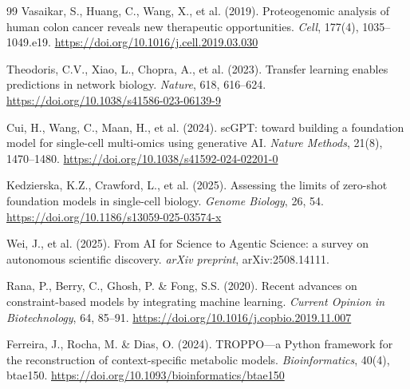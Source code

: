 \documentclass[12pt,a4paper]{article}
\begin{document}
\begin{thebibliography}{99}
 Vasaikar, S., Huang, C., Wang, X., et al. (2019). Proteogenomic analysis of human colon cancer reveals new therapeutic opportunities. \textit{Cell}, 177(4), 1035--1049.e19. \url{https://doi.org/10.1016/j.cell.2019.03.030}

 Theodoris, C.V., Xiao, L., Chopra, A., et al. (2023). Transfer learning enables predictions in network biology. \textit{Nature}, 618, 616--624. \url{https://doi.org/10.1038/s41586-023-06139-9}

 Cui, H., Wang, C., Maan, H., et al. (2024). scGPT: toward building a foundation model for single-cell multi-omics using generative AI. \textit{Nature Methods}, 21(8), 1470--1480. \url{https://doi.org/10.1038/s41592-024-02201-0}

 Kedzierska, K.Z., Crawford, L., et al. (2025). Assessing the limits of zero-shot foundation models in single-cell biology. \textit{Genome Biology}, 26, 54. \url{https://doi.org/10.1186/s13059-025-03574-x}

 Wei, J., et al. (2025). From AI for Science to Agentic Science: a survey on autonomous scientific discovery. \textit{arXiv preprint}, arXiv:2508.14111.

 Rana, P., Berry, C., Ghosh, P. \& Fong, S.S. (2020). Recent advances on constraint-based models by integrating machine learning. \textit{Current Opinion in Biotechnology}, 64, 85--91. \url{https://doi.org/10.1016/j.copbio.2019.11.007}

 Ferreira, J., Rocha, M. \& Dias, O. (2024). TROPPO---a Python framework for the reconstruction of context-specific metabolic models. \textit{Bioinformatics}, 40(4), btae150. \url{https://doi.org/10.1093/bioinformatics/btae150}

\end{thebibliography}
\end{document}
